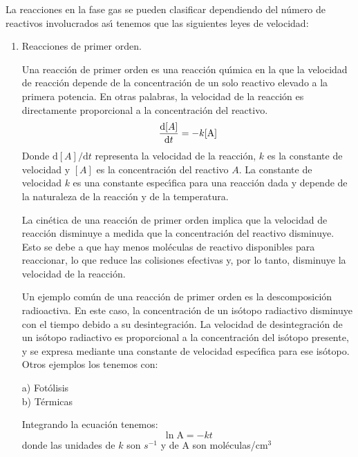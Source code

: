 La reacciones en la fase gas se pueden clasificar dependiendo del n\'umero de reactivos involucrados as\'{\i} tenemos que las siguientes leyes de velocidad:
\begin{enumerate}
\item Reacciones de primer orden.

Una reacci\'on de primer orden es una reacci\'on qu\'{\i}mica en la que la velocidad de reacci\'on depende de la concentraci\'on de un solo reactivo elevado a la primera potencia. En otras palabras, la velocidad de la reacci\'on es directamente proporcional a la concentraci\'on del reactivo.
	 \begin{equation*}
	\frac{\mathrm{d}\textrm[A]}{\mathrm{d}t}=-k[\textrm{A}]
	\end{equation*}
Donde $\mathrm{d}[A]/\mathrm{d}t$ representa la velocidad de la reacci\'on, $k$ es la constante de velocidad y $[A]$ es la concentraci\'on del reactivo $A$. La constante de velocidad $k$ es una constante espec\'{\i}fica para una reacci\'on dada y depende de la naturaleza de la reacci\'on y de la temperatura.

La cin\'etica de una reacci\'on de primer orden implica que la velocidad de reacci\'on disminuye a medida que la concentraci\'on del reactivo disminuye. Esto se debe a que hay menos mol\'eculas de reactivo disponibles para reaccionar, lo que reduce las colisiones efectivas y, por lo tanto, disminuye la velocidad de la reacci\'on.

Un ejemplo com\'un de una reacci\'on de primer orden es la descomposici\'on radioactiva. En este caso, la concentraci\'on de un is\'otopo radiactivo disminuye con el tiempo debido a su desintegraci\'on. La velocidad de desintegraci\'on de un is\'otopo radiactivo es proporcional a la concentraci\'on del is\'otopo presente, y se expresa mediante una constante de velocidad espec\'{\i}fica para ese is\'otopo. Otros ejemplos los tenemos con:
	\begin{description}
		\item[a) Fot\'olisis]  
		\item[b) T\'ermicas] 
	\end{description}
Integrando la ecuaci\'on tenemos:
	\begin{equation*}
	\ln \textrm{A} = -kt
	\end{equation*}
	donde las unidades de $k$ son $s^{-1}$ y de A  son mol\'eculas/cm$^3$
	

\end{enumerate}
